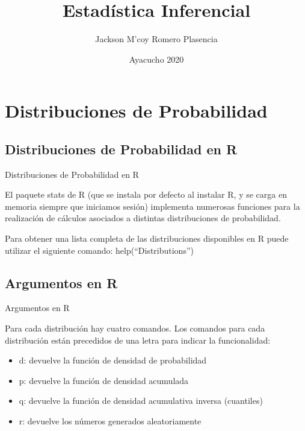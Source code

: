 \documentclass[
  ignorenonframetext,
]{beamer}
\title{Estadística Inferencial}
\author{Jackson M'coy Romero Plasencia}
\date{Ayacucho 2020}
\institute{\large Universidad Nacional de San Cristóbal de Huamanga \and \normalsize Departamento Académico de Matemática y Física}
\begin{document}
\frame{\titlepage}

\begin{frame}
  \tableofcontents[hideallsubsections]
\end{frame}
\hypertarget{distribuciones-de-probabilidad}{%
\section{Distribuciones de
Probabilidad}\label{distribuciones-de-probabilidad}}

\hypertarget{section}{%
\subsection{}\label{section}}

\hypertarget{distribuciones-de-probabilidad-en-r}{%
\subsection{Distribuciones de Probabilidad en
R}\label{distribuciones-de-probabilidad-en-r}}

\begin{frame}{Distribuciones de Probabilidad en R}

\justifying El paquete stats de R (que se instala por defecto al
instalar R, y se carga en memoria siempre que iniciamos sesión)
implementa numerosas funciones para la realización de cálculos asociados
a distintas distribuciones de probabilidad.

Para obtener una lista completa de las distribuciones disponibles en R
puede utilizar el siguiente comando: \color{blue}
help(``Distributions'')

\end{frame}

\hypertarget{argumentos-en-r}{%
\subsection{Argumentos en R}\label{argumentos-en-r}}

\begin{frame}{Argumentos en R}

\justifying Para cada distribución hay cuatro comandos. Los comandos
para cada distribución están precedidos de una letra para indicar la
funcionalidad:

\begin{itemize}
    \item  d: devuelve la función de densidad de probabilidad
    \item  p: devuelve la función de densidad acumulada
    \item q: devuelve la función de densidad acumulativa inversa (cuantiles)
    \item  r: devuelve los números generados aleatoriamente
 \end{itemize}

\end{frame}
\end{document}
